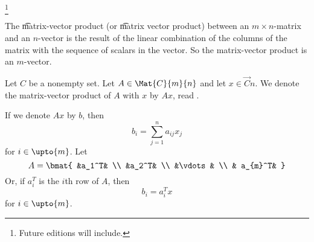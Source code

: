 
\footnote{Future editions will include.}



The \t{matrix-vector product} (or \t{matrix vector product}) between an $m \times n$-matrix and an $n$-vector is the result of the linear combination of the columns of the matrix with the sequence of scalars in the vector.
So the matrix-vector product is an $m$-vector.


Let $C$ be a nonempty set.
Let $A \in \Mat{C}{m}{n}$ and let $x \in \Vec{C}{n}$. We denote the matrix-vector product of $A$ with $x$ by $Ax$, read .

If we denote $Ax$ by $b$, then
$$
  b_i = \sum_{j = 1}^{n} a_{ij}x_j
$$
for $i \in \upto{m}$.
Let
$$
  A = \bmat{
    &a_1^T& \\
    &a_2^T& \\
    &\vdots & \\
    & a_{m}^T&
  }
$$
Or, if $a_i^T$ is the $i$th row of $A$, then
$$
  b_i = a_i^T x
$$
for $i \in \upto{m}$.
